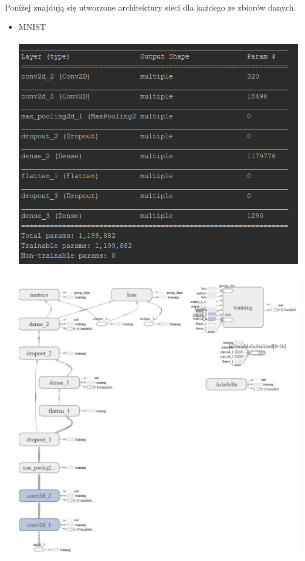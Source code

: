 \documentclass[a4paper,11pt]{article}
\begin{document}
\paragraph{}Poniżej znajdują się utworzone architektury sieci dla każdego ze zbiorów danych.\\
\begin{itemize}
\setlength\itemsep{1em}
	\item MNIST\par\par
	\begin{minipage}{\linewidth}
		\par\paragraph{}
		\centering
		\includegraphics[width=1\linewidth]{modelMnist}
	\end{minipage}
	\begin{minipage}{\linewidth}
		\centering
		\includegraphics[width=1\linewidth]{mnist-graph}
	\end{minipage}
	

\end{itemize}
\end{document}
